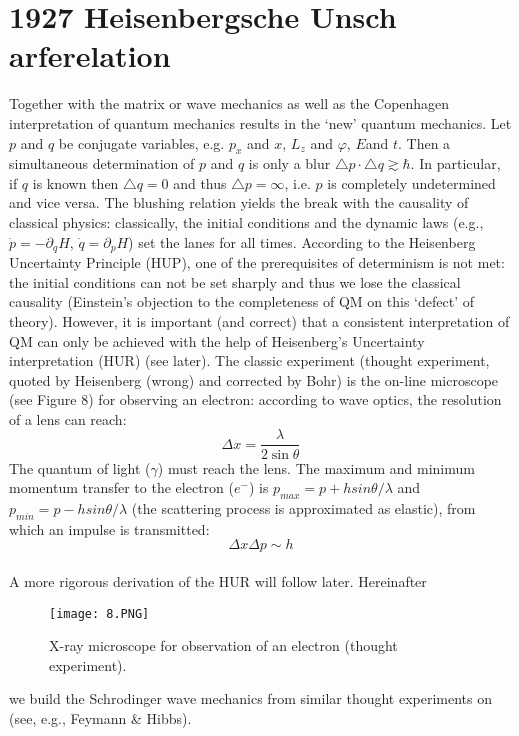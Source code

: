 \section{1927 Heisenbergsche Unsch arferelation}
Together with the matrix or wave mechanics as well as the Copenhagen interpretation of quantum mechanics results in the `new’ quantum mechanics. Let $p$ and $q$ be conjugate variables, e.g. $p_x$ and $x$, $L_z $ and $\varphi$, $E$and $t$. Then a simultaneous determination of $p$ and $q$ is only a blur $\triangle p\cdot \triangle q \gtrsim \hbar$. In particular, if $q$ is known then $\triangle q = 0$ and thus $\triangle p = \infty$, i.e. $p$ is completely undetermined and vice versa. The blushing relation yields the break with the causality of classical physics: classically, the initial conditions and the dynamic laws (e.g., $\dot{p}=-\partial_q{H}$, $\dot{q}=\partial_p{H}$) set the lanes for all times. According to the Heisenberg Uncertainty Principle (HUP), one of the prerequisites of determinism is not met: the initial conditions can not be set sharply and thus we lose the classical causality (Einstein's objection to the completeness of QM on this `defect' of theory). However, it is important (and correct) that a consistent interpretation of QM can only be achieved with the help of Heisenberg's Uncertainty interpretation (HUR) (see later). The classic experiment (thought experiment, quoted by Heisenberg (wrong) and corrected by Bohr) is the on-line microscope (see Figure  8) for observing an electron: according to wave optics, the resolution of a lens can reach:
\begin{equation}
\Delta x=\frac{\lambda}{2 \sin \theta}
\end{equation}
The quantum of light ($\gamma$) must reach the lens. The maximum and minimum momentum transfer to the electron ($e^-$) is $p_{max} = p + h sin\theta/\lambda$ and $p_{min}=p - h sin\theta/\lambda$
(the scattering process is approximated as elastic), from which an impulse is transmitted:
\\
\begin{equation}
\Delta x \Delta p \sim h
\end{equation}\\
A more rigorous derivation of the HUR will follow later. Hereinafter
\begin{figure}[ht]
    \begin{minipage}{0.5\textwidth}
        \centering
        \texttt{[image: 8.PNG]}
    \end{minipage}
    \begin{minipage}{0.5\textwidth}
        \caption{X-ray microscope for observation of an electron (thought experiment).}
    \end{minipage}
    \label{fig:8}
\end{figure}
we build the Schrodinger wave mechanics from similar thought experiments
on (see, e.g., Feymann \& Hibbs).